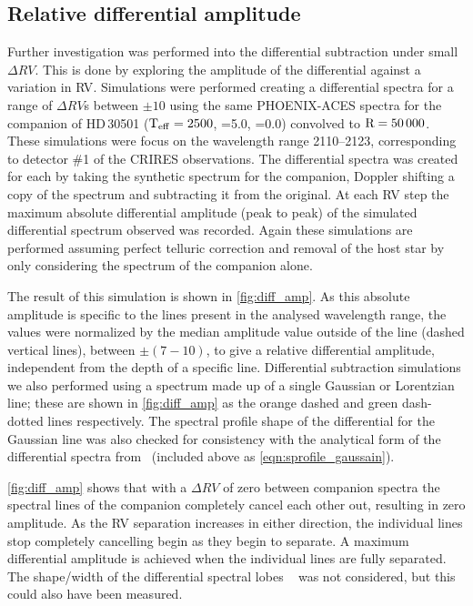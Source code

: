 \subsection{Relative differential amplitude}
\label{relative_differential_amplitue}
Further investigation was performed into the differential subtraction under small \(\Delta RV\).
This is done by exploring the amplitude of the differential against a variation in {RV}.
Simulations were performed creating a differential spectra for a range of \(\Delta {RV}\)s between \(\pm10\)\kmps{} using the same {PHOENIX-ACES} spectra for the companion of {HD\,30501} (\(\textrm{T}_{\mathrm{eff}}{}=2500\)\K{}, \logg{}=5.0, \feh{}=0.0) convolved to \(\textrm{R}=50\,000\).
These simulations were focus on the wavelength range 2110--2123\nm{}, corresponding to detector \#1 of the {CRIRES} observations.
The differential spectra was created for each by taking the synthetic spectrum for the companion, Doppler shifting a copy of the spectrum and subtracting it from the original.
At each {RV} step the maximum absolute differential amplitude (peak to peak) of the simulated differential spectrum observed was recorded.
Again these simulations are performed assuming perfect telluric correction and removal of the host star by only considering the spectrum of the companion alone.

The result of this simulation is shown in \cref{fig:diff_amp}.
As this absolute amplitude is specific to the lines present in the analysed wavelength range, the values were normalized by the median amplitude value outside of the line {\fwhm} (dashed vertical lines), between \(\pm(7-10)\)\kmps{}, to give a relative differential amplitude, independent from the depth of a specific line.
Differential subtraction simulations we also performed using a spectrum made up of a single Gaussian or Lorentzian line; these are shown in \cref{fig:diff_amp} as the orange dashed and green dash-dotted lines respectively.
The spectral profile shape of the differential for the Gaussian line was also checked for consistency with the analytical form of the differential spectra from~\citet[][Equation~A.1]{ferluga_separating_1997} (included above as \cref{eqn:sprofile_gaussain}).

\cref{fig:diff_amp} shows that with a \(\Delta {RV}\) of zero between companion spectra the spectral lines of the companion completely cancel each other out, resulting in zero amplitude.
As the {RV} separation increases in either direction, the individual lines stop completely cancelling begin as they begin to separate.
A maximum differential amplitude is achieved when the individual lines are fully separated.
The shape/width of the differential spectral lobes ~\citet[e.g.][eqn.~A.1]{ferluga_separating_1997} was not considered, but this could also have been measured.

